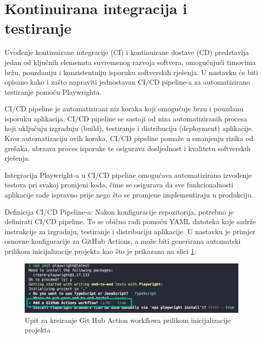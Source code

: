 \section{Kontinuirana integracija i testiranje}\label{CI/CD}
Uvođenje kontinuirane integracije (CI) i kontinuirane dostave (CD) predstavlja jedan od ključnih elemenata suvremenog razvoja softvera, omogućujući timovima bržu, pouzdaniju i konzistentniju isporuku softverskih rješenja. 
U nastavku će biti opisano kako i zašto napraviti jednostavan CI/CD pipeline-a za automatizirano testiranje pomoću Playwrighta.

CI/CD pipeline je automatizirani niz koraka koji omogućuje brzu i pouzdanu isporuku aplikacija. CI/CD pipeline se sastoji od niza automatiziranih procesa koji uključuju izgradnju (build), testiranje i distribuciju (deployment) aplikacije. 
Kroz automatizaciju ovih koraka, CI/CD pipeline pomaže u smanjenju rizika od grešaka, ubrzava proces isporuke te osigurava dosljednost i kvalitetu softverskih rješenja.


Integracija Playwright-a u CI/CD pipeline omogućava automatizirano izvođenje testova pri svakoj promjeni koda, čime se osigurava da sve funkcionalnosti aplikacije rade ispravno prije nego što se promjene implementiraju u produkciju.

Definicija CI/CD Pipeline-a: Nakon konfiguracije repozitorija, potrebno je definirati CI/CD pipeline. To se obično radi pomoću YAML datoteka koje sadrže instrukcije za izgradnju, testiranje i distribuciju aplikacije. U nastavku je primjer osnovne konfiguracije za GitHub Actions, a može biti generirana automatski prilikom inicijalizacije projekta kao što je prikazana na slici \ref{img:ghActionPrompt}:

\begin{figure}[!h]\begin{center}
  \includegraphics[width=1\textwidth]{"img/ghActionPrompt"}
  \caption{Upit za kreiranje Git Hub Action workflowa prilikom inicijalizacije projekta}\label{img:ghActionPrompt}
\end{center}\end{figure}

